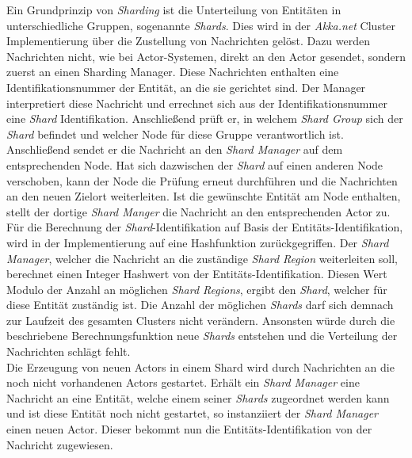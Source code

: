 Ein Grundprinzip von \textit{Sharding} ist die Unterteilung von Entitäten in unterschiedliche Gruppen, sogenannte \textit{Shards}. Dies wird in der \textit{Akka.net} Cluster Implementierung über die Zustellung von Nachrichten gelöst. Dazu werden Nachrichten nicht, wie bei Actor-Systemen, direkt an den Actor gesendet, sondern zuerst an einen Sharding Manager. Diese Nachrichten enthalten eine Identifikationsnummer der Entität, an die sie gerichtet sind. Der Manager interpretiert diese Nachricht und errechnet sich aus der Identifikationsnummer eine \textit{Shard} Identifikation. Anschließend prüft er, in welchem \textit{Shard Group} sich der \textit{Shard} befindet und welcher Node für diese Gruppe verantwortlich ist. Anschließend sendet er die Nachricht an den \textit{Shard Manager} auf dem entsprechenden Node. Hat sich dazwischen der \textit{Shard} auf einen anderen Node verschoben, kann der Node die Prüfung erneut durchführen und die Nachrichten an den neuen Zielort weiterleiten. Ist die gewünschte Entität am Node enthalten, stellt der dortige \textit{Shard Manger} die Nachricht an den entsprechenden Actor zu. \\
Für die Berechnung der \textit{Shard}-Identifikation auf Basis der Entitäts-Identifikation, wird in der Implementierung auf eine Hashfunktion zurückgegriffen. Der \textit{Shard Manager}, welcher die Nachricht an die zuständige \textit{Shard Region} weiterleiten soll, berechnet einen Integer Hashwert von der Entitäts-Identifikation. Diesen Wert Modulo der Anzahl an möglichen \textit{Shard Regions}, ergibt den \textit{Shard}, welcher für diese Entität zuständig ist. Die Anzahl der möglichen \textit{Shards} darf sich demnach zur Laufzeit des gesamten Clusters nicht verändern. Ansonsten würde durch die beschriebene Berechnungsfunktion neue \textit{Shards} entstehen und die Verteilung der Nachrichten schlägt fehlt. \\
Die Erzeugung von neuen Actors in einem Shard wird durch Nachrichten an die noch nicht vorhandenen Actors gestartet. Erhält ein \textit{Shard Manager} eine Nachricht an eine Entität, welche einem seiner \textit{Shards} zugeordnet werden kann und ist diese Entität noch nicht gestartet, so instanziiert der \textit{Shard Manager} einen neuen Actor. Dieser bekommt nun die Entitäts-Identifikation von der Nachricht zugewiesen.
